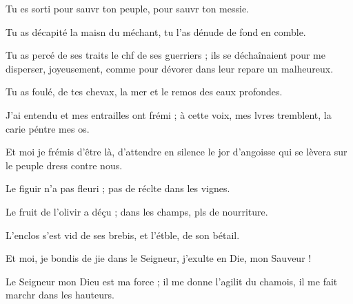 \item Tu es sorti pour sauvr ton peuple,\psstar{} pour sauvr ton messie.
\item Tu as décapité la maisn du méchant,\psstar{} tu l’as dénude de fond en comble.
\item Tu as percé de ses traits le chf de ses guerriers ;\psstar{} ils se déchaînaient pour me disperser, joyeusement, comme pour dévorer dans leur repare un malheureux.
\item Tu as foulé, de tes chevax, la mer\psstar{} et le remos des eaux profondes.
\item J’ai entendu et mes entrailles ont frémi ;\pscross{} à cette voix, mes lvres tremblent,\psstar{} la carie péntre mes os.
\item Et moi je frémis d’être là,\pscross{} d’attendre en silence le jor d’angoisse\psstar{} qui se lèvera sur le peuple dress contre nous.
\item Le figuir n’a pas fleuri ;\psstar{} pas de réclte dans les vignes.
\item Le fruit de l’olivir a déçu ;\psstar{} dans les champs, pls de nourriture.
\item L’enclos s’est vid de ses brebis,\psstar{} et l’étble, de son bétail.
\item Et moi, je bondis de jie dans le Seigneur,\psstar{} j’exulte en Die, mon Sauveur !
\item Le Seigneur mon Dieu est ma force ;\pscross{} il me donne l’agilit du chamois,\psstar{} il me fait marchr dans les hauteurs.